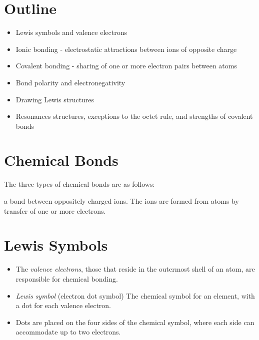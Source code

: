 \documentclass[
	chapter=9,
	title={Basic Concepts of Chemical Bonding},
	showanswers=true,
]{chem122notes}
\begin{document}
\section{Outline}\label{sec:outline-9}

\begin{itemize}
	\item Lewis symbols and valence electrons
	\item Ionic bonding - electrostatic attractions between ions of opposite charge
	\item Covalent bonding - sharing of one or more electron pairs between atoms
	\item Bond polarity and electronegativity
	\item Drawing Lewis structures
	\item Resonances structures, exceptions to the octet rule, and strengths of covalent bonds
\end{itemize}

\section{Chemical Bonds}\label{sec:chemical-bonds}
The three types of chemical bonds are as follows:
\begin{description}[font=\emph]
	\item[ionic bond] a bond between oppositely charged ions.
	The ions are formed from atoms by transfer of one or more electrons.
	\item[covalent bond]
\end{description}

\section{Lewis Symbols}\label{sec:lewis-symbols}
\begin{itemize}
	\item The \emph{valence electrons}, those that reside in the outermost shell of an atom, are responsible for chemical bonding.
	\item \emph{Lewis symbol} (electron dot symbol) The chemical symbol for an element, with a dot for each valence electron.
	\item Dots are placed on the four sides of the chemical symbol, where each side can accommodate up to two electrons.
\end{itemize}
\end{document}
